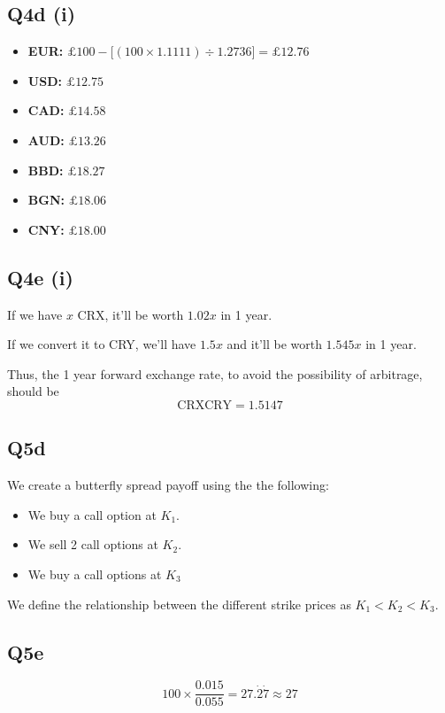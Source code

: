 \documentclass[a4paper]{article}[10pt]
\begin{document}
\subsection*{Q4d (i)}

\begin{itemize}
	\item \textbf{EUR:} $\pounds 100 - \big[(100 \times 1.1111) \div 1.2736\big]	 = \pounds 12.76$
	\item \textbf{USD:} $\pounds 12.75$
	\item \textbf{CAD:} $\pounds 14.58$
	\item \textbf{AUD:} $\pounds 13.26$
	\item \textbf{BBD:} $\pounds 18.27$
	\item \textbf{BGN:} $\pounds 18.06$
	\item \textbf{CNY:} $\pounds 18.00$
\end{itemize}

\subsection*{Q4e (i)}
If we have $x$ CRX, it'll be worth $1.02x$ in 1 year. 

\noindent If we convert it to CRY, we'll have $1.5x$ and it'll be worth $1.545x$ in 1 year.

\noindent Thus, the 1 year forward exchange rate, to avoid the possibility of arbitrage, should be 
\begin{equation}
\text{CRXCRY} = 1.5147
\end{equation}

\subsection*{Q5d}
We create a butterfly spread payoff using the the following:
\begin{itemize}
	\item We buy a call option at $K_1$. 
	\item We sell 2 call options at $K_2$.
	\item We buy a call options at $K_3$
\end{itemize}
We define the relationship between the different strike prices as $K_1 < K_2 < K_3$.


\subsection*{Q5e}
\begin{equation}
    100 \times \frac{0.015}{0.055} = 27.\dot{2}\dot{7} \approx 27
\end{equation}
\end{document}
